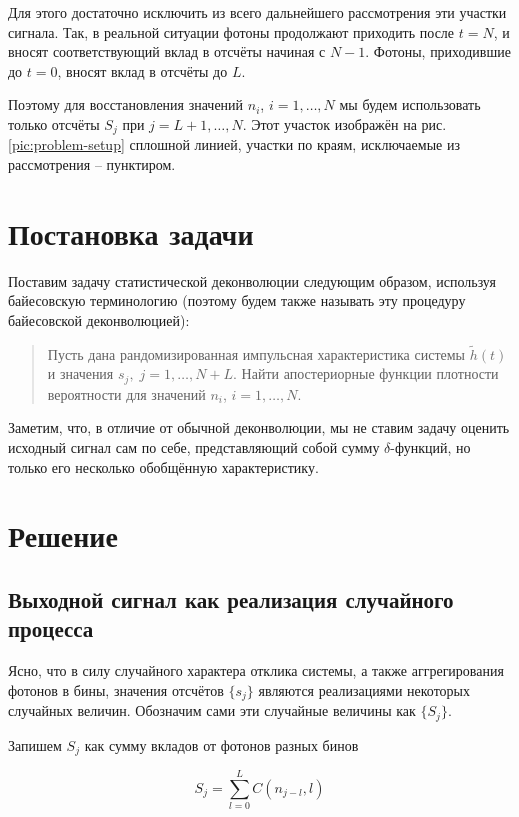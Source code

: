 Для этого достаточно исключить из всего дальнейшего рассмотрения эти участки сигнала. Так, в реальной ситуации фотоны продолжают приходить после $t=N$, и вносят соответствующий вклад в отсчёты начиная с $N-1$. Фотоны, приходившие до $t=0$, вносят вклад в отсчёты до $L$.

Поэтому для восстановления значений $n_i$, $i = 1, \ldots, N$ мы будем использовать только отсчёты $S_j$ при $j = L+1, \ldots, N$. Этот участок изображён на рис. \ref{pic:problem-setup} сплошной линией, участки по краям, исключаемые из рассмотрения -- пунктиром.


\section{Постановка задачи}

Поставим задачу статистической деконволюции следующим образом, используя байесовскую терминологию (поэтому будем также называть эту процедуру байесовской деконволюцией):

\begin{quote}
	Пусть дана рандомизированная импульсная характеристика системы $\tilde{h}(t)$ и значения $s_j, \; j = 1, \ldots, N + L$. Найти апостериорные функции плотности вероятности для значений $n_i$, $i = 1, \ldots, N$.
\end{quote}

Заметим, что, в отличие от обычной деконволюции, мы не ставим задачу оценить исходный сигнал сам по себе, представляющий собой сумму $\delta$-функций, но только его несколько обобщённую характеристику.

\section{Решение}

\subsection{Выходной сигнал как реализация случайного процесса}

Ясно, что в силу случайного характера отклика системы, а также аггрегирования фотонов в бины, значения отсчётов $\{ s_j \}$ являются реализациями некоторых случайных величин. Обозначим сами эти случайные величины как $\{ S_j \}$.

Запишем $S_j$ как сумму вкладов от фотонов разных бинов

\begin{equation}
	S_j = \sum_{l=0}^{L} C(n_{j-l}, l)
	\label{eq:S-definition-as-random-variable}
\end{equation}

